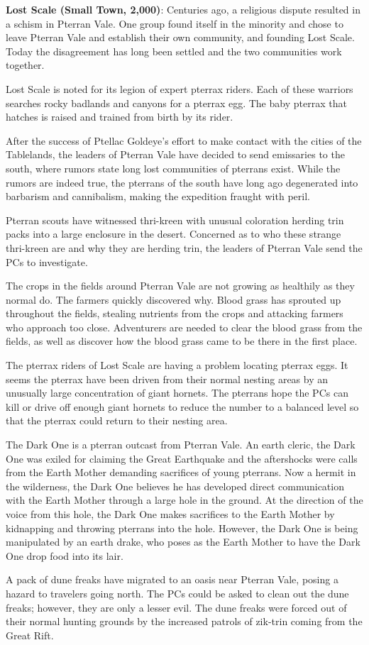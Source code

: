 {
	\textbf{Lost Scale (Small Town, 2,000)}: Centuries ago, a religious dispute resulted in a schism in Pterran Vale. One group found itself in the minority and chose to leave Pterran Vale and establish their own community, and founding Lost Scale. Today the disagreement has long been settled and the two communities work together.

	Lost Scale is noted for its legion of expert pterrax riders. Each of these warriors searches rocky badlands and canyons for a pterrax egg. The baby pterrax that hatches is raised and trained from birth by its rider.
}
{}
{
	\item After the success of Ptellac Goldeye's effort to make contact with the cities of the Tablelands, the leaders of Pterran Vale have decided to send emissaries to the south, where rumors state long lost communities of pterrans exist. While the rumors are indeed true, the pterrans of the south have long ago degenerated into barbarism and cannibalism, making the expedition fraught with peril.
	\item Pterran scouts have witnessed thri-kreen with unusual coloration herding trin packs into a large enclosure in the desert. Concerned as to who these strange thri-kreen are and why they are herding trin, the leaders of Pterran Vale send the PCs to investigate.
	\item The crops in the fields around Pterran Vale are not growing as healthily as they normal do. The farmers quickly discovered why. Blood grass has sprouted up throughout the fields, stealing nutrients from the crops and attacking farmers who approach too close. Adventurers are needed to clear the blood grass from the fields, as well as discover how the blood grass came to be there in the first place.
	\item The pterrax riders of Lost Scale are having a problem locating pterrax eggs. It seems the pterrax have been driven from their normal nesting areas by an unusually large concentration of giant hornets. The pterrans hope the PCs can kill or drive off enough giant hornets to reduce the number to a balanced level so that the pterrax could return to their nesting area.
	\item The Dark One is a pterran outcast from Pterran Vale. An earth cleric, the Dark One was exiled for claiming the Great Earthquake and the aftershocks were calls from the Earth Mother demanding sacrifices of young pterrans. Now a hermit in the wilderness, the Dark One believes he has developed direct communication with the Earth Mother through a large hole in the ground. At the direction of the voice from this hole, the Dark One makes sacrifices to the Earth Mother by kidnapping and throwing pterrans into the hole. However, the Dark One is being manipulated by an earth drake, who poses as the Earth Mother to have the Dark One drop food into its lair.
	\item A pack of dune freaks have migrated to an oasis near Pterran Vale, posing a hazard to travelers going north. The PCs could be asked to clean out the dune freaks; however, they are only a lesser evil. The dune freaks were forced out of their normal hunting grounds by the increased patrols of zik-trin coming from the Great Rift.
}
